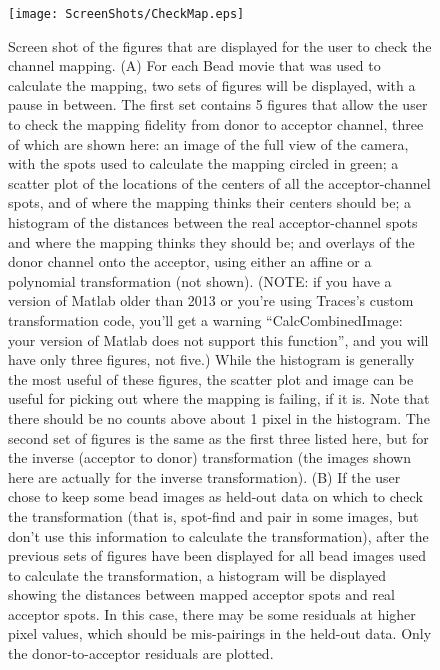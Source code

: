 \documentclass[11pt]{article}
\begin{document}
\begin{figure}
\begin{center}
\texttt{[image: ScreenShots/CheckMap.eps]}
\caption{Screen shot of the figures that are displayed for the user to check the channel mapping. (A) For each Bead movie that was used to calculate the mapping, two sets of figures will be displayed, with a pause in between.  The first set contains 5 figures that allow the user to check the mapping fidelity from donor to acceptor channel, three of which are shown here: an image of the full view of the camera, with the spots used to calculate the mapping circled in green; a scatter plot of the locations of the centers of all the acceptor-channel spots, and of where the mapping thinks their centers should be; a histogram of the distances between the real acceptor-channel spots and where the mapping thinks they should be; and overlays of the donor channel onto the acceptor, using either an affine or a polynomial transformation (not shown).  (NOTE: if you have a version of Matlab older than 2013 or you're using Traces's custom transformation code, you'll get a warning ``CalcCombinedImage: your version of Matlab does not support this function'', and you will have only three figures, not five.) While the histogram is generally the most useful of these figures, the scatter plot and image can be useful for picking out where the mapping is failing, if it is.  Note that there should be no counts above about 1 pixel in the histogram. The second set of figures is the same as the first three listed here, but for the inverse (acceptor to donor) transformation (the images shown here are actually for the inverse transformation). (B) If the user chose to keep some bead images as held-out data on which to check the transformation (that is, spot-find and pair in some images, but don't use this information to calculate the transformation), after the previous sets of figures have been displayed for all bead images used to calculate the transformation, a histogram will be displayed showing the distances between mapped acceptor spots and real acceptor spots.  In this case, there may be some residuals at higher pixel values, which should be mis-pairings in the held-out data. Only the donor-to-acceptor residuals are plotted.}
\label{fig:MapCheckShot}
\end{center}
\end{figure}
\end{document}
